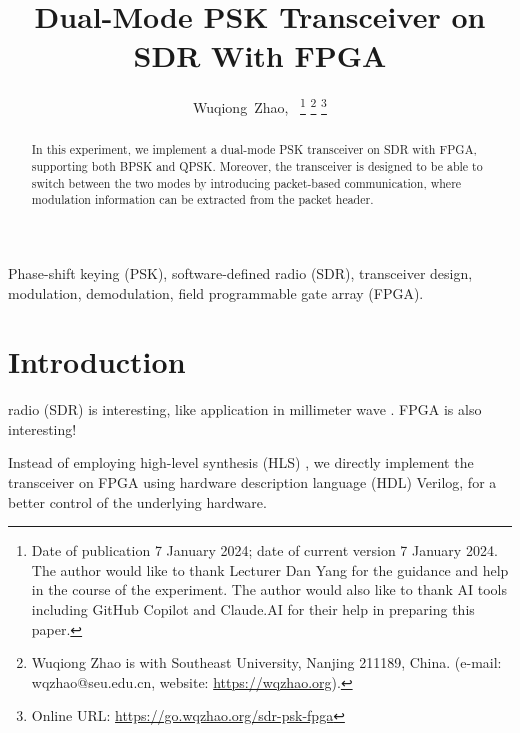 \documentclass[journal,twoside]{IEEEtran}
\begin{document}
  \title{Dual-Mode PSK Transceiver on SDR With FPGA}

  \author{%
    Wuqiong~Zhao{\hspace{.1em}\textsuperscript{}},~
    \thanks{Date of publication 7 January 2024; date of current version 7 January 2024.
      The author would like to thank Lecturer Dan Yang for the guidance and help in the course of the experiment.
      The author would also like to thank AI tools including GitHub Copilot and Claude.AI for their help in preparing this paper.}
    \thanks{Wuqiong Zhao is with Southeast University, Nanjing 211189, China. (e-mail: wqzhao@seu.edu.cn, website: \url{https://wqzhao.org}).}
    \thanks{Online URL: \url{https://go.wqzhao.org/sdr-psk-fpga}}
  }


  \maketitle

  \begin{abstract}
    In this experiment, we implement a dual-mode PSK transceiver on SDR with FPGA,
    supporting both BPSK and QPSK.
    Moreover, the transceiver is designed to be able to switch between the two modes by introducing packet-based communication,
    where modulation information can be extracted from the packet header.
  \end{abstract}
  \begin{IEEEkeywords}
    Phase-shift keying (PSK), software-defined radio (SDR), transceiver design, modulation, demodulation, field programmable gate array (FPGA).
  \end{IEEEkeywords}

  \section{Introduction}

     radio (SDR) is interesting, like application in millimeter wave \cite{zhao2020m}.
    FPGA is also interesting!

    Instead of employing high-level synthesis (HLS) \cite{zhao2023flexible},
    we directly implement the transceiver on FPGA using hardware description language (HDL) Verilog,
    for a better control of the underlying hardware.
\end{document}
